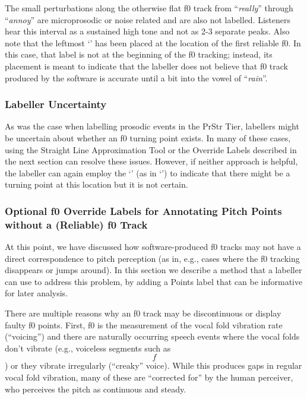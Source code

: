 \documentclass[11pt, twoside]{memoir}
\def\textlabel#1{{\relsize{-.5}\fontspec[Mapping=tex-text]{Roboto Mono}{#1}}}
\def\langtext#1{\textit{#1}}
\def\ipabrackets#1{\[{#1}\]}
\begin{document}
The small perturbations along the otherwise flat f0 track from “\langtext{really}” through “\langtext{annoy}” are microprosodic or noise related and are also not labelled. Listeners hear this interval as a sustained high tone and not as 2-3 separate peaks. Also note that the leftmost ‘\textlabel{0}’ has been placed at the location of the first reliable f0. In this case, that label is not at the beginning of the f0 tracking; instead, its placement is meant to indicate that the labeller does not believe that f0 track produced by the software is accurate until a bit into the vowel of “\langtext{rain}”.


\subsubsection{Labeller Uncertainty}\label{sec:labeller-uncertainty-points}

As was the case when labelling prosodic events in the PrStr Tier, labellers might be uncertain about whether an f0 turning point exists. In many of these cases, using the Straight Line Approximation Tool or the Override Labels described in the next section can resolve these issues. However, if neither approach is helpful, the labeller can again employ the ‘\textlabel{?}’ (as in ‘\textlabel{?0}’) to indicate that there might be a turning point at this location but it is not certain.

\subsubsection{Optional f0 Override Labels for Annotating Pitch Points without a (Reliable) f0 Track}\label{sec:optional-f0-override-labels-for-annotating-pitch-points-without-a-reliable-f0-track}

At this point, we have discussed how software-produced f0 tracks may not have a direct correspondence to pitch perception (as in, e.g., cases where the f0 tracking disappears or jumps around). In this section we describe a method that a labeller can use to address this problem, by adding a Points label that can be informative for later analysis.

There are multiple reasons why an f0 track may be discontinuous or display faulty f0 points. First, f0 is the measurement of the vocal fold vibration rate (“voicing”) and there are naturally occurring speech events where the vocal folds don’t vibrate (e.g., voiceless segments such as \ipabrackets{f}) or they vibrate irregularly (“creaky” voice). While this produces gaps in regular vocal fold vibration, many of these are “corrected for” by the human perceiver, who perceives the pitch as continuous and steady.
\end{document}
